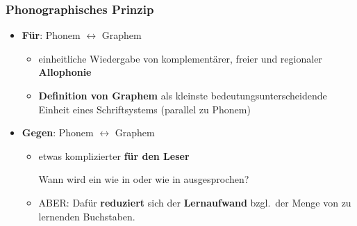 \begin{frame}
\frametitle{Phonographisches Prinzip}

\begin{itemize}
	\item \textbf{Für}: Phonem $\leftrightarrow$ Graphem
	
	\begin{itemize}
		\item einheitliche Wiedergabe von komplementärer, freier und regionaler \textbf{Allophonie}

		\item \textbf{Definition von Graphem} als kleinste bedeutungsunterscheidende Einheit eines Schriftsystems (parallel zu Phonem)
	\end{itemize}

\pause 
	
	\item \textbf{Gegen}: Phonem $\leftrightarrow$ Graphem
	
	\begin{itemize}
		\item etwas komplizierter \textbf{für den Leser}
		
		\ea Wann wird ein  wie in  oder wie in  ausgesprochen?
		\z 
		
		\item ABER: Dafür \textbf{reduziert} sich der \textbf{Lernaufwand} bzgl.\ der Menge von zu lernenden Buchstaben.	
	\end{itemize}
\end{itemize}

\end{frame}


